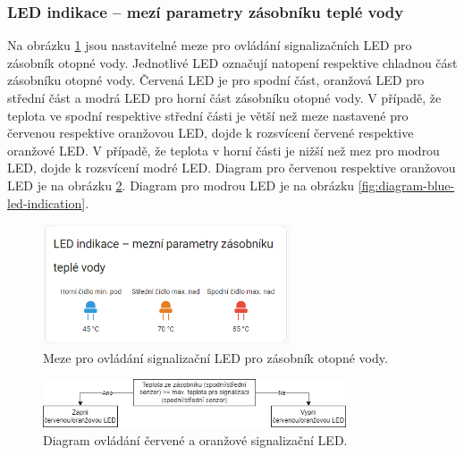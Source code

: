 
\begin{Czech}
\subsubsection{LED indikace – mezí parametry zásobníku teplé vody}
\end{Czech}
\label{sec:led-indication}

\begin{Czech}
Na obrázku \ref{fig:led-indication} jsou nastavitelné meze pro ovládání signalizačních LED pro zásobník otopné vody. Jednotlivé LED označují natopení respektive chladnou část zásobníku otopné vody. Červená LED je pro spodní část, oranžová LED pro střední část a modrá LED pro horní část zásobníku otopné vody. V případě, že teplota ve spodní respektive střední části je větší než meze nastavené pro červenou respektive oranžovou LED, dojde k rozsvícení červené respektive oranžové LED. V případě, že teplota v horní části je nižší než mez pro modrou LED, dojde k rozsvícení modré LED. Diagram pro červenou respektive oranžovou LED je na obrázku \ref{fig:diagram-red-orange-led-indication}. Diagram pro modrou LED je na obrázku \ref{fig:diagram-blue-led-indication}.
\end{Czech}

\begin{Czech}
\begin{figure}[H]
    \centering
    \includegraphics[width=0.65\textwidth]{pictures/czech/software/led-indication.png}
    \caption{Meze pro ovládání signalizační LED pro zásobník otopné vody.}
    \label{fig:led-indication}
\end{figure}
\end{Czech}

\begin{Czech}
\begin{figure}[H]
    \centering
    \includegraphics[width=0.8\textwidth]{pictures/czech/software/diagram-red-orange-led-indication.png}
    \caption{Diagram ovládání červené a oranžové signalizační LED.}
    \label{fig:diagram-red-orange-led-indication}
\end{figure}
\end{Czech}

